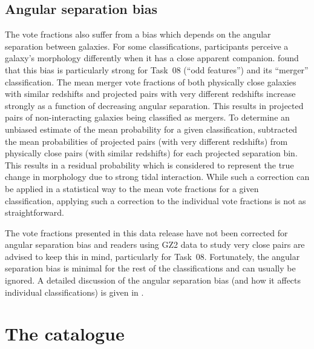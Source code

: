 \documentclass[useAMS,usenatbib]{mn2e}
\begin{document}
\subsection{Angular separation bias}\label{ang-bias}

The vote fractions also suffer from a bias which depends on the angular separation between galaxies. For some classifications, participants perceive a galaxy's morphology differently when it has a close apparent companion. \citet{cas13} found that this bias is particularly strong for Task~08 (``odd features'') and its ``merger'' classification. The mean merger vote fractions of both physically close galaxies with similar redshifts and projected pairs with very different redshifts increase strongly as a function of decreasing angular separation. This results in projected pairs of non-interacting galaxies being classified as mergers. To determine an unbiased estimate of the mean probability for a given classification, \citet{cas13} subtracted the mean probabilities of projected pairs (with very different redshifts) from physically close pairs (with similar redshifts) for each projected separation bin. This results in a residual probability which is considered to represent the true change in morphology due to strong tidal interaction. While such a correction can be applied in a statistical way to the mean vote fractions for a given classification, applying such a correction to the individual vote fractions is not as straightforward.

The vote fractions presented in this data release have not been corrected for angular separation bias and readers using GZ2 data to study very close pairs are advised to keep this in mind, particularly for Task~08. Fortunately, the angular separation bias is minimal for the rest of the classifications and can usually be ignored. A detailed discussion of the angular separation bias (and how it affects individual classifications) is given in \citet{cas13}.


\section{The catalogue} \label{sec-catalogue}
\end{document}

